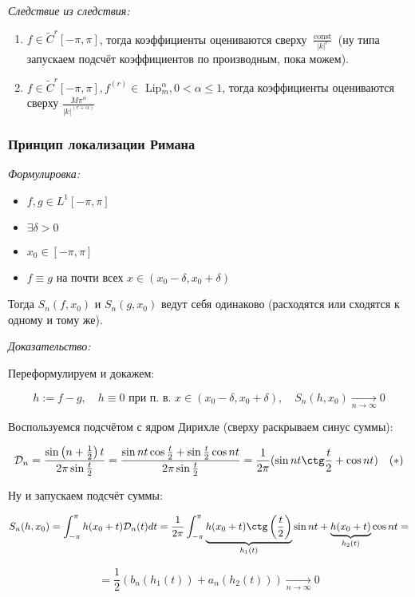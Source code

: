 \documentclass{article}
\def\goesto#1{\underset{#1}{\longrightarrow}}
\def\toinf#1{\goesto{#1 \rightarrow \infty}}
\def\ntoinf{\toinf{n}}
\def\DD{\mathcal{D}}
\DeclareMathOperator{\const}{const}
\begin{document}
\textit{Следствие из следствия:}

\begin{enumerate}
    \item $f \in \tilde{C}^r[-\pi, \pi]$, тогда коэффициенты оцениваются сверху $\frac{\const}{|k|^r}$ (ну типа запускаем подсчёт коэффициентов по производным, пока можем).
    \item $f \in \tilde{C}^r[-\pi, \pi], f^{(r)} \in$ Lip$_m^\alpha, 0 < \alpha \le 1$, тогда коэффициенты оцениваются сверху $\frac{M \pi^\alpha}{|k|^{(r + \alpha)}}$
\end{enumerate}

\subsubsection{Принцип локализации Римана}
\textit{Формулировка:}

\begin{itemize}
    \item $f, g \in L^1[-\pi, \pi]$
    \item $\exists \delta > 0$
    \item $x_0 \in [-\pi, \pi]$
    \item $f \equiv g$ на почти всех $x \in (x_0 - \delta, x_0 + \delta)$
\end{itemize}

Тогда $S_n(f, x_0)$ и $S_n(g, x_0)$ ведут себя одинаково (расходятся или сходятся к одному и тому же).

\textit{Доказательство:}

Переформулируем и докажем:

\[h := f - g, \quad h \equiv 0 \text{ при п. в. } x \in (x_0 - \delta, x_0 + \delta), \quad S_n(h, x_0) \ntoinf 0\]

Воспользуемся подсчётом с ядром Дирихле (сверху раскрываем синус суммы):

\[\DD_n = \frac{\sin \left( n + \frac{1}{2}\right)t}{2\pi\sin \frac{t}{2}} = \frac{\sin nt \cos \frac{t}{2} + \sin\frac{t}{2}\cos nt}{2\pi\sin \frac{t}{2}} = \frac{1}{2\pi}(\sin nt \ctg \frac{t}{2} + \cos nt) \quad (*)\]

Ну и запускаем подсчёт суммы:

\[S_n(h, x_0) = \int_{-\pi}^{\pi} h(x_0 + t) \DD_n(t) dt = \frac{1}{2\pi}\int_{-\pi}^{\pi}\underbrace{h(x_0 + t) \ctg \left(\frac{t}{2}\right)}_{h_1(t)}\sin nt + \underbrace{h(x_0 + t)}_{h_2(t)}\cos nt = \]

\[= \frac{1}{2} \left(b_n(h_1(t)) + a_n(h_2(t))\right) \ntoinf 0\]
\end{document}
